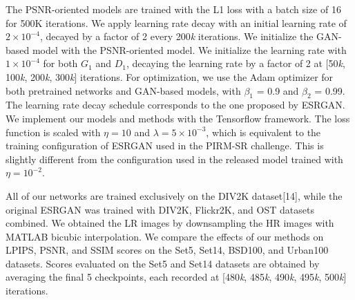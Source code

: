 \documentclass{article}
\begin{document}
The PSNR-oriented models are trained with the L1 loss with a batch size of 16 for 500K iterations. We apply learning rate decay with an initial learning rate of $2\times10^{-4}$, decayed by a factor of 2 every 200\textit{k} iterations. We initialize the GAN-based model with the PSNR-oriented model. We initialize the learning rate with $1\times10^{-4}$ for both $G_{1}$ and $D_{1}$, decaying the learning rate by a factor of 2 at [50\textit{k}, 100\textit{k}, 200\textit{k}, 300\textit{k}] iterations. For optimization, we use the Adam optimizer for both pretrained networks and GAN-based models, with $\beta_{1}$ = 0.9 and $\beta_{2}$ = 0.99. The learning rate decay schedule corresponds to the one proposed by ESRGAN. We implement our models and methods with the Tensorflow framework. The loss function is scaled with $\eta=10$ and $\lambda=5\times10^{-3}$, which is equivalent to the training configuration of ESRGAN used in the PIRM-SR challenge. This is slightly different from the configuration used in the released model trained with $\eta=10^{-2}$.

All of our networks are trained exclusively on the DIV2K dataset[14], while the original ESRGAN was trained with DIV2K, Flickr2K, and OST datasets combined. We obtained the LR images by downsampling the HR images with MATLAB bicubic interpolation. We compare the effects of our methods on LPIPS, PSNR, and SSIM scores on the Set5, Set14, BSD100, and Urban100 datasets. Scores evaluated on the Set5 and Set14 datasets are obtained by averaging the final 5 checkpoints, each recorded at [480\textit{k}, 485\textit{k}, 490\textit{k}, 495\textit{k}, 500\textit{k}] iterations.
\end{document}
